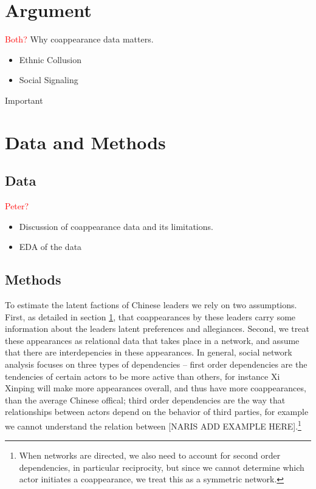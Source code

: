 \documentclass[12pt]{amsart}
\begin{document}
\section{Argument}
\label{argument}
\textcolor{red}{Both?}
Why coappearance data matters.
\begin{itemize}
\item Ethnic Collusion
\item Social Signaling
\end{itemize}
Important
\section{Data and Methods}
\subsection{Data}
\textcolor{red}{Peter?}
\begin{itemize}
\item Discussion of coappearance data and its limitations.
\item EDA of the data
\end{itemize}
\subsection{Methods}
To estimate the latent factions of Chinese leaders we rely on two assumptions. First, as detailed in section \ref{argument}, that coappearances by these leaders carry some information about the leaders latent preferences and allegiances. Second, we treat these appearances as relational data that takes place in a network, and assume that there are interdepencies in these appearances. In general, social network analysis focuses on three types of dependencies -- first order dependencies are the tendencies of certain actors to be more active than others, for instance Xi Xinping will make more appearances overall, and thus have more coappearances, than the average Chinese offical; third order dependencies are the way that relationships between actors depend on the behavior of third parties, for example we cannot understand the relation between [NARIS ADD EXAMPLE HERE].\footnote{When networks are directed, we also need to account for second order dependencies, in particular reciprocity, but since we cannot determine which actor initiates a coappearance, we treat this as a symmetric network.}
\end{document}
